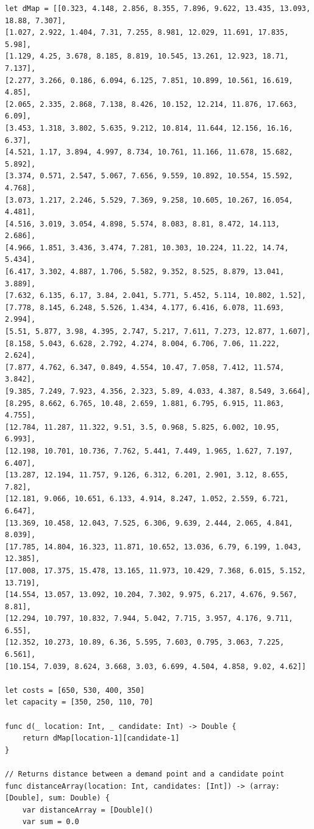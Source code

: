 \documentclass[10pt]{article}
\begin{document}
\begin{verbatim}
let dMap = [[0.323, 4.148, 2.856, 8.355, 7.896, 9.622, 13.435, 13.093, 18.88, 7.307],
[1.027, 2.922, 1.404, 7.31, 7.255, 8.981, 12.029, 11.691, 17.835, 5.98],
[1.129, 4.25, 3.678, 8.185, 8.819, 10.545, 13.261, 12.923, 18.71, 7.137],
[2.277, 3.266, 0.186, 6.094, 6.125, 7.851, 10.899, 10.561, 16.619, 4.85],
[2.065, 2.335, 2.868, 7.138, 8.426, 10.152, 12.214, 11.876, 17.663, 6.09],
[3.453, 1.318, 3.802, 5.635, 9.212, 10.814, 11.644, 12.156, 16.16, 6.37],
[4.521, 1.17, 3.894, 4.997, 8.734, 10.761, 11.166, 11.678, 15.682, 5.892],
[3.374, 0.571, 2.547, 5.067, 7.656, 9.559, 10.892, 10.554, 15.592, 4.768],
[3.073, 1.217, 2.246, 5.529, 7.369, 9.258, 10.605, 10.267, 16.054, 4.481],
[4.516, 3.019, 3.054, 4.898, 5.574, 8.083, 8.81, 8.472, 14.113, 2.686],
[4.966, 1.851, 3.436, 3.474, 7.281, 10.303, 10.224, 11.22, 14.74, 5.434],
[6.417, 3.302, 4.887, 1.706, 5.582, 9.352, 8.525, 8.879, 13.041, 3.889],
[7.632, 6.135, 6.17, 3.84, 2.041, 5.771, 5.452, 5.114, 10.802, 1.52],
[7.778, 8.145, 6.248, 5.526, 1.434, 4.177, 6.416, 6.078, 11.693, 2.994],
[5.51, 5.877, 3.98, 4.395, 2.747, 5.217, 7.611, 7.273, 12.877, 1.607],
[8.158, 5.043, 6.628, 2.792, 4.274, 8.004, 6.706, 7.06, 11.222, 2.624],
[7.877, 4.762, 6.347, 0.849, 4.554, 10.47, 7.058, 7.412, 11.574, 3.842],
[9.385, 7.249, 7.923, 4.356, 2.323, 5.89, 4.033, 4.387, 8.549, 3.664],
[8.295, 8.662, 6.765, 10.48, 2.659, 1.881, 6.795, 6.915, 11.863, 4.755],
[12.784, 11.287, 11.322, 9.51, 3.5, 0.968, 5.825, 6.002, 10.95, 6.993],
[12.198, 10.701, 10.736, 7.762, 5.441, 7.449, 1.965, 1.627, 7.197, 6.407],
[13.287, 12.194, 11.757, 9.126, 6.312, 6.201, 2.901, 3.12, 8.655, 7.82],
[12.181, 9.066, 10.651, 6.133, 4.914, 8.247, 1.052, 2.559, 6.721, 6.647],
[13.369, 10.458, 12.043, 7.525, 6.306, 9.639, 2.444, 2.065, 4.841, 8.039],
[17.785, 14.804, 16.323, 11.871, 10.652, 13.036, 6.79, 6.199, 1.043, 12.385],
[17.008, 17.375, 15.478, 13.165, 11.973, 10.429, 7.368, 6.015, 5.152, 13.719],
[14.554, 13.057, 13.092, 10.204, 7.302, 9.975, 6.217, 4.676, 9.567, 8.81],
[12.294, 10.797, 10.832, 7.944, 5.042, 7.715, 3.957, 4.176, 9.711, 6.55],
[12.352, 10.273, 10.89, 6.36, 5.595, 7.603, 0.795, 3.063, 7.225, 6.561],
[10.154, 7.039, 8.624, 3.668, 3.03, 6.699, 4.504, 4.858, 9.02, 4.62]]

let costs = [650, 530, 400, 350]
let capacity = [350, 250, 110, 70]

func d(_ location: Int, _ candidate: Int) -> Double {
    return dMap[location-1][candidate-1]
}

// Returns distance between a demand point and a candidate point
func distanceArray(location: Int, candidates: [Int]) -> (array: [Double], sum: Double) {
    var distanceArray = [Double]()
    var sum = 0.0
    

\end{verbatim}
\end{document}
